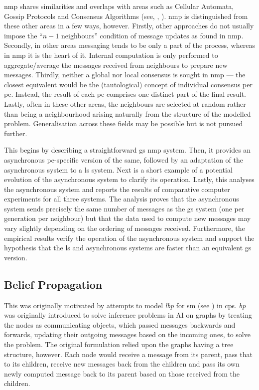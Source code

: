 \Gls{nmp} shares similarities and overlaps with areas such as Cellular Automata, Gossip Protocols and Consensus Algorithms (see, \eg{}, \cite{Deserable2012,Hollander2015}).  \Gls{nmp} is distinguished from these other areas in a few ways, however.  Firstly, other approaches do not usually impose the ``\(n - 1\) neighbours'' condition of message updates as found in \gls{nmp}.  Secondly, in other areas messaging tends to be only a part of the process, whereas in \gls{nmp} it is the heart of it.  Internal computation is only performed to aggregate/average the messages received from neighbours to prepare new messages.  Thirdly, neither a global nor local consensus is sought in \gls{nmp} --- the closest equivalent would be the (tautological) concept of individual consensus per \gls{pe}.  Instead, the result of each \gls{pe} comprises one distinct part of the final result.  Lastly, often in these other areas, the neighbours are selected at random rather than being a neighbourhood arising naturally from the structure of the modelled problem.  Generalisation across these fields may be possible but is not pursued further.

This  begins by describing a straightforward \gls{gs} \gls{nmp} system.  Then, it provides an asynchronous \gls{pe}-specific version of the same, followed by an adaptation of the asynchronous system to a \gls{ls} system. Next is a short example of a potential evolution of the asynchronous system to clarify its operation.  Lastly, this  analyses the asynchronous system and reports the results of comparative computer experiments for all three systems.  The analysis proves that the asynchronous system sends precisely the same number of messages as the \gls{gs} system (one per generation per neighbour) but that the data used to compute new messages may vary slightly depending on the ordering of messages received.  Furthermore, the empirical results verify the operation of the asynchronous system and support the hypothesis that the \gls{ls} and asynchronous systems are faster than an equivalent \gls{gs} version.

\subsection{Belief Propagation}

This  was originally motivated by attempts to model \emph{\gls{lbp}} for \gls{sm} (see \eg{} \cite{Blake2011,Felzenszwalb2011,Sun2003}) in \gls{cps}.  \emph{\Gls{bp}} was originally introduced to solve inference problems in AI on graphs \cite{Pearl1982} by treating the nodes as communicating objects, which passed messages backwards and forwards, updating their outgoing messages based on the incoming ones, to solve the problem.  The original formulation relied upon the graphs having a tree structure, however.  Each node would receive a message from its parent, pass that to its children, receive new messages back from the children and pass its own newly computed message back to its parent based on those received from the children.

